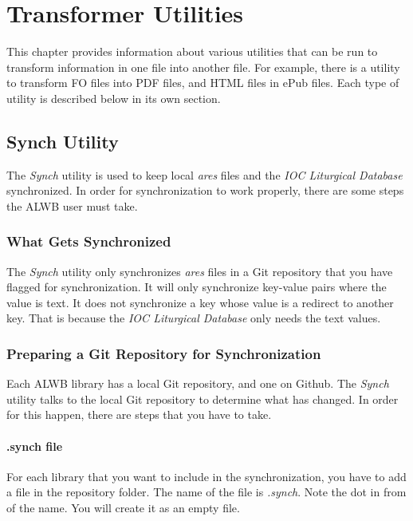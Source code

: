\documentclass[]{memoir}
\begin{document}
\chapter{Transformer Utilities}

This chapter provides information about various utilities that can be run to transform information in one file into another file.  For example, there is a utility to transform FO files into PDF files, and HTML files in ePub files.  Each type of utility is described below in its own section.

\section{Synch Utility}

The \emph{Synch} utility is used to keep local \emph{ares} files and the \emph{IOC Liturgical Database} synchronized.  In order for synchronization to work properly, there are some steps the ALWB user must take.

\subsection{What Gets Synchronized}

The \emph{Synch} utility only synchronizes \emph{ares} files in a Git repository that you have flagged for synchronization.  It will only synchronize key-value pairs where the value is text.  It does not synchronize a key whose value is a redirect to another key.  That is because the \emph{IOC Liturgical Database} only needs the text values.

\subsection{Preparing a Git Repository for Synchronization}

Each ALWB library has a local Git repository, and one on Github. The \emph{Synch} utility talks to the local Git repository to determine what has changed.  In order for this happen, there are steps that you have to take.

\subsubsection{.synch file}
For each library that you want to include in the synchronization, you have to add a file in the repository folder.  The name of the file is \emph{.synch}.  Note the dot in from of the name.  You will create it as an empty file.  
\end{document}
